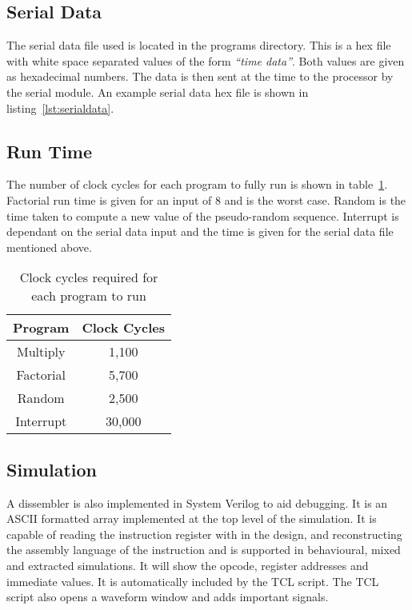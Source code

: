 



\subsection{Serial Data}

The serial data file used is located in the programs directory. 
This is a hex file with white space separated values of the form \textit{``time data''}.
Both values are given as hexadecimal numbers. 
The data is then sent at the time to the processor by the serial module. 
An example serial data hex file is shown in listing~\ref{lst:serialdata}.



\subsection{Run Time}
The number of clock cycles for each program to fully run is shown in table~\ref{tab:runtimes}. 
Factorial run time is given for an input of 8 and is the worst case. 
Random is the time taken to compute a new value of the pseudo-random sequence. 
Interrupt is dependant on the serial data input and the time is given for the serial data file mentioned above.

\begin{table}
\centering
\caption{Clock cycles required for each program to run}
\label{tab:runtimes}
\begin{tabular}{|c|c|} \hline
Program & Clock Cycles \\ \hline
Multiply	& 1,100	\\
Factorial	& 5,700	\\
Random		& 2,500	\\
Interrupt	& 30,000	\\ \hline
\end{tabular}
\end{table}

\subsection{Simulation}

A dissembler is also implemented in System Verilog to aid debugging.
It is an ASCII formatted array implemented at the top level of the simulation. 
It is capable of reading the instruction register with in the design, and reconstructing the assembly language of the instruction and is supported in behavioural, mixed and extracted simulations.
It will show the opcode, register addresses and immediate values.
It is automatically included by the TCL script.
The TCL script also opens a waveform window and adds important signals.
